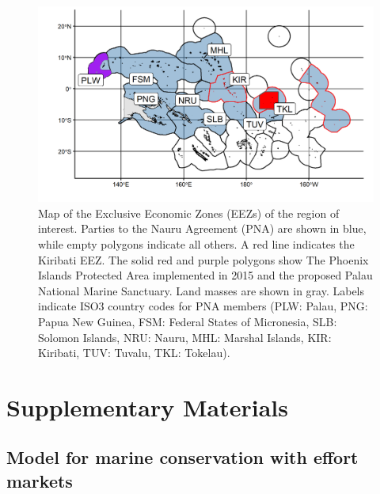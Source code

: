 \documentclass[12pt]{article}
\begin{document}
\begin{figure}
\centering
\includegraphics{img/PNA_map.png}
\caption{\label{fig:PNA_map}Map of the Exclusive Economic Zones (EEZs) of the region of interest. Parties to the Nauru Agreement (PNA) are shown in blue, while empty polygons indicate all others. A red line indicates the Kiribati EEZ. The solid red and purple polygons show The Phoenix Islands Protected Area implemented in 2015 and the proposed Palau National Marine Sanctuary. Land masses are shown in gray. Labels indicate ISO3 country codes for PNA members (PLW: Palau, PNG: Papua New Guinea, FSM: Federal States of Micronesia, SLB: Solomon Islands, NRU: Nauru, MHL: Marshal Islands, KIR: Kiribati, TUV: Tuvalu, TKL: Tokelau).}
\end{figure}



\clearpage

\FloatBarrier

\newcommand{\beginsupplement}{\setcounter{table}{0}  \renewcommand{\thetable}{S\arabic{table}} \setcounter{figure}{0} \renewcommand{\thefigure}{S\arabic{figure}}}

\setcounter{table}{0}  \renewcommand{\thetable}{S\arabic{table}} \setcounter{figure}{0} \renewcommand{\thefigure}{S\arabic{figure}}

\section{Supplementary Materials}

\subsection{Model for marine conservation with effort markets}
\end{document}
